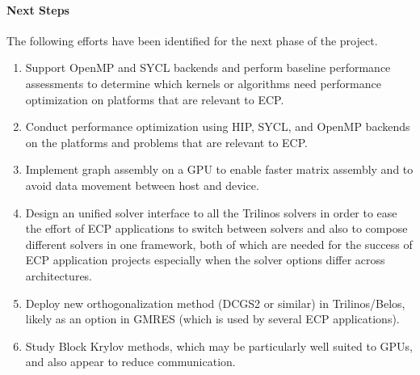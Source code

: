 \paragraph{Next Steps}
The following efforts have been identified for the next phase of the project.
\begin{enumerate}
\item Support OpenMP and SYCL backends and
      perform baseline performance assessments to determine which kernels or algorithms need performance optimization
      on platforms that are relevant to ECP.
\item Conduct performance optimization using HIP, SYCL, and OpenMP backends on the platforms and problems
      that are relevant to ECP.
\item Implement graph assembly on a GPU to enable faster matrix assembly and to avoid data movement between host and device.
\item Design an unified solver interface to all the Trilinos solvers in order to ease the effort of ECP applications
      to switch between solvers and also to compose different solvers in one framework, both of which are needed for the success of ECP application projects especially when the solver options differ across architectures.
\item Deploy new orthogonalization method (DCGS2 or similar) in Trilinos/Belos, likely as an option in GMRES (which is used by several ECP applications).
\item Study Block Krylov methods, which may be particularly well suited to GPUs, and also appear to reduce communication.
\end{enumerate}

